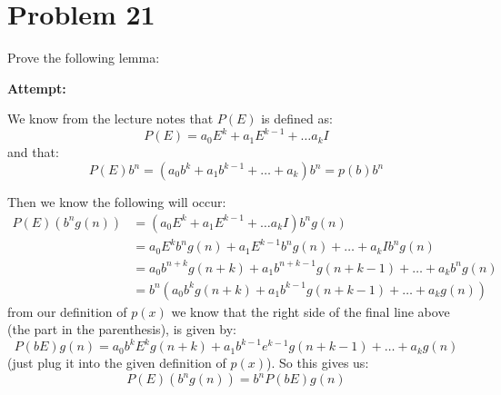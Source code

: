 \documentclass[12pt,letterpaper]{article}
\theoremstyle{definition}
\begin{document}
\section*{Problem 21}

Prove the following lemma:




\textbf{Attempt:}
\begin{changemargin}{.5cm}{0cm}

We know from the lecture notes that $P(E)$ is defined as:
\begin{equation*}
    P(E) = a_0E^k + a_1E^{k-1} +\dots a_kI
\end{equation*}
and that:
\begin{equation*}
    P(E)b^n = \left( a_0 b^k + a_1b^{k-1}+\ldots +a_k \right)b^n = p(b)b^n
\end{equation*}

Then we know the following will occur:
\begin{align*}
    P(E)(b^ng(n)) &= \left(a_0E^k+a_1E^{k-1} +\dots a_kI \right)b^ng(n)\\
    &=a_0E^kb^ng(n) + a_1E^{k-1}b^ng(n) +\ldots +a_kIb^ng(n)\\
    &=a_0b^{n+k}g(n+k) +a_1b^{n+k-1}g(n+k-1)+\ldots +a_kb^ng(n)\\
    &=b^n(a_0b^kg(n+k) +a_1b^{k-1}g(n+k-1) +\ldots +a_kg(n))
\end{align*}
from our definition of $p(x)$ we know that the right side of the final line above (the part in the parenthesis), is given by:
\begin{equation*}
    P(bE)g(n) = a_0b^kE^kg(n+k) + a_1b^{k-1}e^{k-1}g(n+k-1) + \ldots +a_kg(n)
\end{equation*}
(just plug it into the given definition of $p(x)$). So this gives us:
\begin{equation*}
    P(E)(b^ng(n))=b^nP(bE)g(n)
\end{equation*}

\end{changemargin}
\end{document}
